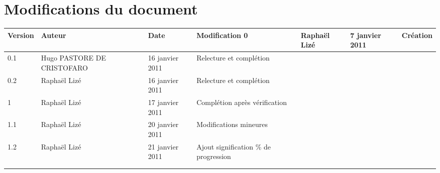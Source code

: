 
\section*{Modifications du document}

\begin{center}
\begin{longtable}{|m{14mm}||m{36mm}|m{36mm}|m{60mm}|}
\hline
Version & Auteur & Date & Modification\endhead \hline
0
& %
Raphaël Lizé
& %
7 janvier 2011
& %
Création
\\\hline
0.1
& %
Hugo PASTORE DE CRISTOFARO
& %
16 janvier 2011
& %
Relecture et complétion
\\\hline
0.2
& %
Raphaël Lizé
& %
16 janvier 2011
& %
Relecture et complétion
\\\hline
1
& %
Raphaël Lizé
& %
17 janvier 2011
& %
Complétion après vérification
\\\hline
1.1
& %
Raphaël Lizé
& %
20 janvier 2011
& %
Modifications mineures
\\\hline
1.2
& %
Raphaël Lizé
& %
21 janvier 2011
& %
Ajout signification \% de progression
\\\hline

& %

& %

& %

\\\hline

& %

& %

& %

\\\hline
\end{longtable}
\end{center}

